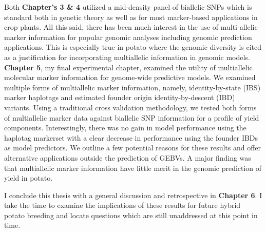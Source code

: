 Both \textbf{Chapter's 3 \& 4} utilized a mid-density panel of biallelic SNPs which is standard both in genetic theory as well as for most marker-based applications in crop plants. All this said, there has been much interest in the use of multi-allelic marker information for popular genomic analyses including genomic prediction applications. This is especially true in potato where the genomic diversity is cited as a justification for incorporating multiallelic information in genomic models. \textbf{Chapter 5}, my final experimental chapter, examined the utility of multiallelic molecular marker information for genome-wide predictive models. We examined multiple forms of multiallelic marker information, namely, identity-by-state (IBS) marker haplotags and estimated founder origin identity-by-descent (IBD) variants. Using a traditional cross validation methodology, we tested both forms of multiallelic marker data against biallelic SNP information for a profile of yield components. Interestingly, there was no gain in model performance using the haplotag markerset with a clear decrease in performance using the founder IBDs as model predictors. We outline a few potential reasons for these results and offer alternative applications outside the prediction of GEBVs. A major finding was that multiallelic marker information have little merit in the genomic prediction of yield in potato.

I conclude this thesis with a general discussion and retrospective in \textbf{Chapter 6}. I take the time to examine the implications of these results for future hybrid potato breeding and locate questions which are still unaddressed at this point in time.

